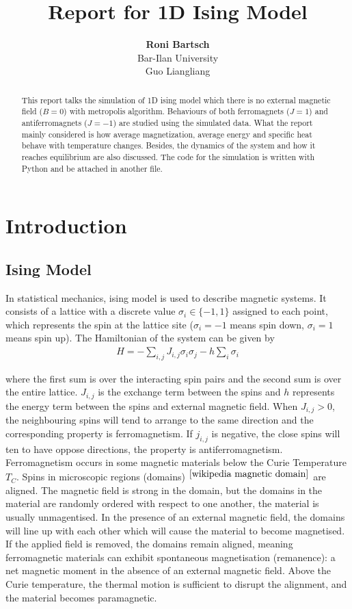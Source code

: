 \documentclass[12pt]{article}
\title{\Large{\textbf{Report for 1D Ising Model\\}}}
\author{\textbf{Roni Bartsch}\\
	Bar-Ilan University\\Guo Liangliang}
\date{}
\begin{document}
	\maketitle
	
	\begin{abstract}
		This report talks the simulation of 1D ising model which there is no external magnetic field ($B=0$) with metropolis algorithm. Behaviours of both ferromagnets ($J=1$) and antiferromagnets ($J=-1$) are studied using the simulated data. What the report mainly considered is how  average magnetization, average energy and specific heat behave with temperature changes. Besides, the dynamics of the system and how it reaches equilibrium are also discussed. The code for the simulation is written with Python and be attached in another file.
	\end{abstract}
	
	\section{Introduction}
	\label{sec: introduction} 
	
	\subsection{Ising Model}
	\label{sec: ising model}
	In statistical mechanics, ising model is used to describe magnetic systems. It consists of a lattice with a discrete value $\sigma _i  \in \{-1,1\}$ assigned to each point, which represents the spin at the lattice site ($\sigma_i=-1$ means spin down, $\sigma_i=1$ means spin up). The Hamiltonian of the system can be given by 
	\begin{align}\label{equ: hamiltonian of ising model}
		H=-\sum_{i,j}J_{i,j}\sigma_i \sigma _j -h \sum_i \sigma_i
	\end{align}
	
	where the first sum is over the interacting spin pairs and the second sum is over the entire lattice. $J_{i,j}$ is the exchange term between the spins and $h$ represents the energy term between the spins and external magnetic field. When $J_{i,j}>0$, the neighbouring spins will tend to arrange to the same direction and the corresponding property is ferromagnetism. If $j_{i,j}$ is negative, the close spins will ten to have oppose directions, the property is antiferromagnetism.  Ferromagnetism occurs in some magnetic materials below the Curie Temperature $T_C$. Spins in microscopic regions (domains) $^{\cite{wikipedia magnetic domain}}$ are aligned. The magnetic field is strong in the domain, but the domains in the material are randomly ordered with respect to one another, the material is usually unmagentised. In the presence of an external magnetic field, the domains will line up with each other which will cause the material to become magnetised.  If the applied field is removed, the domains remain aligned, meaning ferromagnetic materials can exhibit spontaneous magnetisation (remanence): a net magnetic moment in the absence of an external magnetic field. Above the Curie temperature, the thermal motion is sufficient to disrupt the alignment, and the material becomes paramagnetic. 
	
\end{document}
